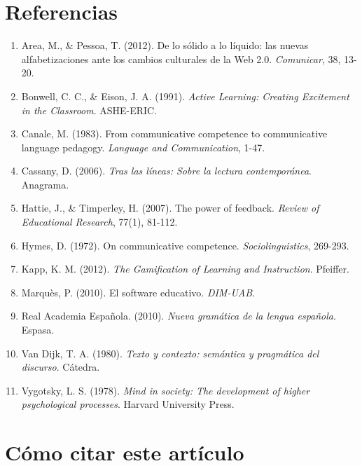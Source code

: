 \documentclass[12pt,spanish]{article}
\begin{document}
\section{Referencias}

\begin{enumerate}
    \item Area, M., \& Pessoa, T. (2012). De lo sólido a lo líquido: las nuevas alfabetizaciones ante los cambios culturales de la Web 2.0. \textit{Comunicar}, 38, 13-20.

    \item Bonwell, C. C., \& Eison, J. A. (1991). \textit{Active Learning: Creating Excitement in the Classroom}. ASHE-ERIC.

    \item Canale, M. (1983). From communicative competence to communicative language pedagogy. \textit{Language and Communication}, 1-47.

    \item Cassany, D. (2006). \textit{Tras las líneas: Sobre la lectura contemporánea}. Anagrama.

    \item Hattie, J., \& Timperley, H. (2007). The power of feedback. \textit{Review of Educational Research}, 77(1), 81-112.

    \item Hymes, D. (1972). On communicative competence. \textit{Sociolinguistics}, 269-293.

    \item Kapp, K. M. (2012). \textit{The Gamification of Learning and Instruction}. Pfeiffer.

    \item Marquès, P. (2010). El software educativo. \textit{DIM-UAB}.

    \item Real Academia Española. (2010). \textit{Nueva gramática de la lengua española}. Espasa.

    \item Van Dijk, T. A. (1980). \textit{Texto y contexto: semántica y pragmática del discurso}. Cátedra.

    \item Vygotsky, L. S. (1978). \textit{Mind in society: The development of higher psychological processes}. Harvard University Press.
\end{enumerate}

\section{Cómo citar este artículo}
\end{document}
